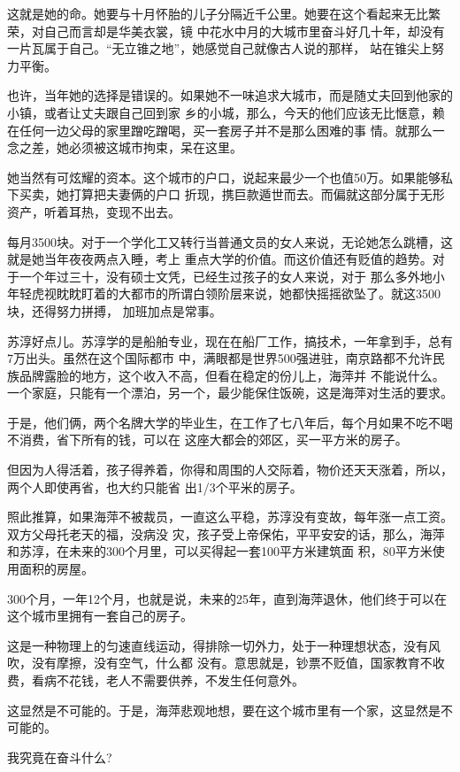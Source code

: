 \documentclass[11pt,a4paper,onecolumn]{article}
\begin{document}
这就是她的命。她要与十月怀胎的儿子分隔近千公里。她要在这个看起来无比繁荣，对自己而言却是华美衣裳，镜
中花水中月的大城市里奋斗好几十年，却没有一片瓦属于自己。``无立锥之地''，她感觉自己就像古人说的那样，
站在锥尖上努力平衡。

也许，当年她的选择是错误的。如果她不一味追求大城市，而是随丈夫回到他家的小镇，或者让丈夫跟自己回到家
乡的小城，那么，今天的他们应该无比惬意，赖在任何一边父母的家里蹭吃蹭喝，买一套房子并不是那么困难的事
情。就那么一念之差，她必须被这城市拘束，呆在这里。

她当然有可炫耀的资本。这个城市的户口，说起来最少一个也值50万。如果能够私下买卖，她打算把夫妻俩的户口
折现，携巨款遁世而去。而偏就这部分属于无形资产，听着耳热，变现不出去。

每月3500块。对于一个学化工又转行当普通文员的女人来说，无论她怎么跳槽，这就是她当年夜夜两点入睡，考上
重点大学的价值。而这价值还有贬值的趋势。对于一个年过三十，没有硕士文凭，已经生过孩子的女人来说，对于
那么多外地小年轻虎视眈眈盯着的大都市的所谓白领阶层来说，她都快摇摇欲坠了。就这3500块，还得努力拼搏，
加班加点是常事。

苏淳好点儿。苏淳学的是船舶专业，现在在船厂工作，搞技术，一年拿到手，总有7万出头。虽然在这个国际都市
中，满眼都是世界500强进驻，南京路都不允许民族品牌露脸的地方，这个收入不高，但看在稳定的份儿上，海萍并
不能说什么。一个家庭，只能有一个漂泊，另一个，最少能保住饭碗，这是海萍对生活的要求。

于是，他们俩，两个名牌大学的毕业生，在工作了七八年后，每个月如果不吃不喝不消费，省下所有的钱，可以在
这座大都会的郊区，买一平方米的房子。

但因为人得活着，孩子得养着，你得和周围的人交际着，物价还天天涨着，所以，两个人即使再省，也大约只能省
出1/3个平米的房子。

照此推算，如果海萍不被裁员，一直这么平稳，苏淳没有变故，每年涨一点工资。双方父母托老天的福，没病没
灾，孩子受上帝保佑，平平安安的话，那么，海萍和苏淳，在未来的300个月里，可以买得起一套100平方米建筑面
积，80平方米使用面积的房屋。

300个月，一年12个月，也就是说，未来的25年，直到海萍退休，他们终于可以在这个城市里拥有一套自己的房子。

这是一种物理上的匀速直线运动，得排除一切外力，处于一种理想状态，没有风吹，没有摩擦，没有空气，什么都
没有。意思就是，钞票不贬值，国家教育不收费，看病不花钱，老人不需要供养，不发生任何意外。

这显然是不可能的。于是，海萍悲观地想，要在这个城市里有一个家，这显然是不可能的。

我究竟在奋斗什么?
\end{document}
